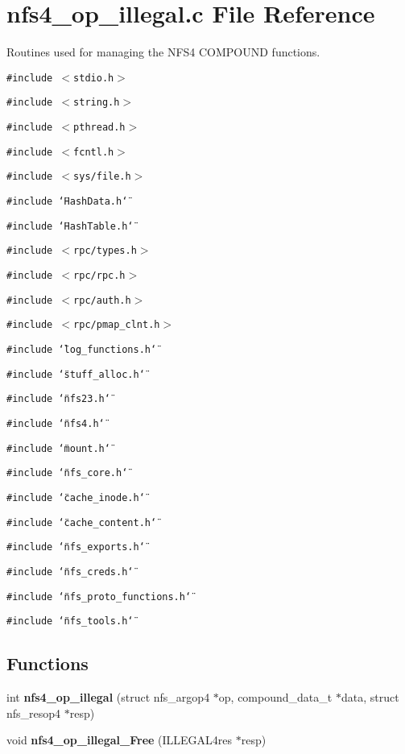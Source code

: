 \section{nfs4\_\-op\_\-illegal.c File Reference}
\label{nfs4__op__illegal_8c}
Routines used for managing the NFS4 COMPOUND functions. 

{\tt \#include $<$stdio.h$>$}\par
{\tt \#include $<$string.h$>$}\par
{\tt \#include $<$pthread.h$>$}\par
{\tt \#include $<$fcntl.h$>$}\par
{\tt \#include $<$sys/file.h$>$}\par
{\tt \#include \char`\"{}Hash\-Data.h\char`\"{}}\par
{\tt \#include \char`\"{}Hash\-Table.h\char`\"{}}\par
{\tt \#include $<$rpc/types.h$>$}\par
{\tt \#include $<$rpc/rpc.h$>$}\par
{\tt \#include $<$rpc/auth.h$>$}\par
{\tt \#include $<$rpc/pmap\_\-clnt.h$>$}\par
{\tt \#include \char`\"{}log\_\-functions.h\char`\"{}}\par
{\tt \#include \char`\"{}stuff\_\-alloc.h\char`\"{}}\par
{\tt \#include \char`\"{}nfs23.h\char`\"{}}\par
{\tt \#include \char`\"{}nfs4.h\char`\"{}}\par
{\tt \#include \char`\"{}mount.h\char`\"{}}\par
{\tt \#include \char`\"{}nfs\_\-core.h\char`\"{}}\par
{\tt \#include \char`\"{}cache\_\-inode.h\char`\"{}}\par
{\tt \#include \char`\"{}cache\_\-content.h\char`\"{}}\par
{\tt \#include \char`\"{}nfs\_\-exports.h\char`\"{}}\par
{\tt \#include \char`\"{}nfs\_\-creds.h\char`\"{}}\par
{\tt \#include \char`\"{}nfs\_\-proto\_\-functions.h\char`\"{}}\par
{\tt \#include \char`\"{}nfs\_\-tools.h\char`\"{}}\par
\subsection*{Functions}
\begin{CompactItemize}
\item 
int {\bf nfs4\_\-op\_\-illegal} (struct nfs\_\-argop4 $\ast$op, compound\_\-data\_\-t $\ast$data, struct nfs\_\-resop4 $\ast$resp)
\item 
void {\bf nfs4\_\-op\_\-illegal\_\-Free} (ILLEGAL4res $\ast$resp)
\end{CompactItemize}


